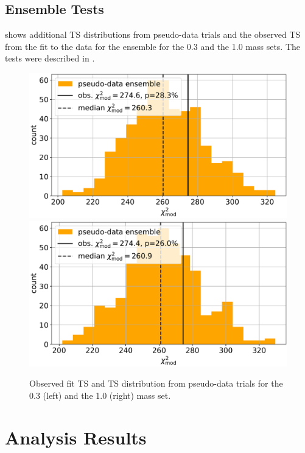 

\section{Ensemble Tests} 

 shows additional TS distributions from pseudo-data trials and the observed TS from the fit to the data for the ensemble for the \SI{0.3}{\gev} and the \SI{1.0}{\gev} mass sets. The tests were described in .

\begin{figure}[h]
    \includegraphics[width=0.49\linewidth]{figures/results/blind_fits/full_blind_fit_0.3_GeV_gauss_plus_poisson_step_3_4-1.png}
    \includegraphics[width=0.49\linewidth]{figures/results/blind_fits/full_blind_fit_1.0_GeV_gauss_plus_poisson_step_3_4-1.png}
	\caption[Pseudo-data trials TS distribution (\SI{0.3}{\gev}, \SI{1.0}{\gev})]{Observed fit TS and TS distribution from pseudo-data trials for the \SI{0.3}{\gev} (left) and the \SI{1.0}{\gev} (right) mass set.}
\end{figure}


\chapter{Analysis Results}


